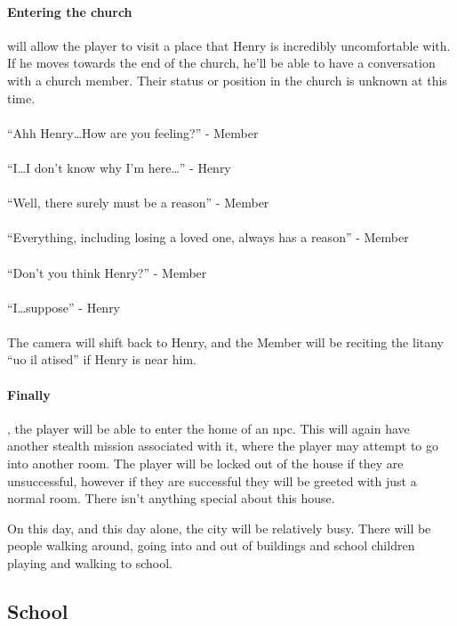 \documentclass[12pt, a4paper, titlepage]{article}
\begin{document}
            \paragraph{Entering the church} will allow the player to visit a place that Henry is incredibly uncomfortable with. If he moves towards the end of the church, he'll be able
            to have a conversation with a church member. Their status or position in the church is unknown at this time.\\~\\
            
            ``Ahh Henry\ldots How are you feeling?'' - Member\\~\\
            ``I\ldots I don't know why I'm here\ldots'' - Henry\\~\\
            ``Well, there surely must be a reason'' - Member\\~\\
            ``Everything, including losing a loved one, always has a reason'' - Member\\~\\
            ``Don't you think Henry?'' - Member\\~\\
            ``I\ldots suppose'' - Henry\\~\\
            
            The camera will shift back to Henry, and the Member will be reciting the litany ``uo il atised'' if Henry is near him.
            
            \paragraph{Finally}, the player will be able to enter the home of an npc. This will again have another stealth mission associated with it, where the player may
            attempt to go into another room. The player will be locked out of the house if they are unsuccessful, however if they are successful they will be greeted with just
            a normal room. There isn't anything special about this house.

            On this day, and this day alone, the city will be relatively busy. There will be people walking around, going into and out of buildings and school children
            playing and walking to school.

        \subsection{School}
\end{document}
